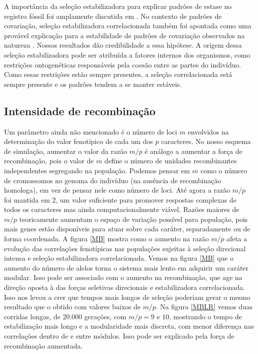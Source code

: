 A importância da seleção estabilizadora para explicar padrões de estase
no registro fóssil foi amplamente discutida em \cite{Charlesworth1982a}.
No contexto de padrões de covariação, seleção estabilizadora
correlacionada também foi apontada como uma provável explicação para a
estabilidade de padrões de covariação observados na natureza
\citep{Cheverud1984, Marroig2001, Porto2009}.
Nossos resultados dão credibilidade a essa hipótese.
A origem dessa seleção estabilizadora pode ser atribuída a fatores
internos dos organismos, como restrições ontogenéticas responsáveis pela
coesão entre as partes do indivíduo.
Como essas restrições estão sempre presentes, a seleção correlacionada
está sempre presente e os padrões tendem a se manter estáveis.

\subsection{Intensidade de recombinação}

Um parâmetro ainda não mencionado é o número de loci $m$ envolvidos na
determinação do valor fenotípico de cada um dos $p$ caracteres.
No nosso esquema de simulação, aumentar o valor da razão $m/p$ é análogo
a aumentar a força de recombinação, pois o valor de $m$ define o número
de unidades recombinantes independentes segregando na população.
Podemos pensar em $m$ como o número de cromossomos no genoma do
indivíduo (na ausência de recombinação homologa), em vez de pensar nele
como número de loci. Até agora a razão $m/p$ foi
mantida em 2, um valor suficiente para promover respostas complexas de
todos os caracteres mas ainda computacionalmente viável.
Razões maiores de $m/p$ teoricamente aumentam o espaço de variação
possível para população, pois mais genes estão disponíveis para atuar
sobre cada caráter, separadamente ou de forma coordenada.
A figura \ref{MB} mostra como o aumento na razão $m/p$ afeta a evolução
das correlações fenotípicas nas populações sujeitas à seleção direcional
intensa e seleção estabilizadora correlacionada.
Vemos na figura \ref{MB} que o aumento do número de alelos torna o
sistema mais lento em adquirir um caráter modular.
Isso pode ser associado com o aumento na recombinação, que age na
direção oposta à das forças seletivas direcionais e estabilizadora
correlacionada.
Isso nos levou a crer que tempos mais longos de seleção poderiam gerar o
mesmo resultado que o obtido com valores baixos de $m/p$.
Na figura \ref{MBLR} vemos duas corridas longas, de 20.000 gerações, com
$m/p = 9$ e $10$, mostrando o tempo de estabilização mais longo e a
modularidade mais discreta, com menor diferença nas correlações dentro
de e entre módulos.
Isso pode ser explicado pela força de recombinação aumentada.

